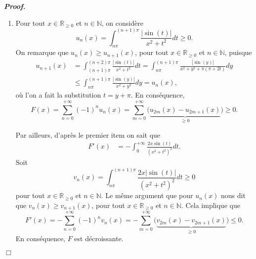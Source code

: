 \documentclass[11pt,a4paper]{article}
\newcommand{\NN}{\mathbb{N}}
\newcommand{\RR}{\mathbb{R}}
\newenvironment{preuve}[1][]
{\vskip 2mm  \noindent\emph{\bf Proof#1. }}{$\Box$ \vskip 2mm}
\let\geq\geqslant
\let\leq\leqslant
\begin{document}
\begin{preuve}
\begin{enumerate}
			\item Pour tout $x \in \RR_{\geq 0}$ et $n \in \NN$, on considère 
			\[     u_n(x) = \int_{n\pi}^{(n+1)\pi} \frac{|\sin (t)|}{ x^2+t^2} dt \geq 0.     \]
			On remarque que $u_{n}(x) \geq u_{n+1}(x)$, pour tout $x \in \RR_{\geq 0}$ et $n \in \NN$, puisque 
			\begin{align*}
			u_{n+1}(x) &= \int_{(n+1)\pi}^{(n+2)\pi} \frac{|\sin (t)|}{ x^2+t^2} dt = \int_{n\pi}^{(n+1)\pi} \frac{|\sin (y)|}{ x^2+y^2 + \pi (\pi + 2t)} dy 
			\\
			&\leq \int_{n\pi}^{(n+1)\pi} \frac{|\sin (y)|}{ x^2+y^2} dy = u_{n}(x),     
			\end{align*} 
			où l'on a fait la substitution $t = y + \pi$. 
			En conséquence, 
			\[     F(x) = \sum_{n=0}^{+\infty} (-1)^{n} u_{n}(x) = \sum_{m=0}^{+\infty} \big(\underset{\geq 0}{\underbrace{u_{2m}(x) - u_{2m+1}(x)}}\big) \geq 0.     \]
			
			Par ailleurs, d'après le premier item on sait que 
			\begin{align*}
			F'(x) &= - \int_{0}^{+\infty} \frac{2 x \sin (t)}{ (x^2+t^2)^{2}} dt.          
			\end{align*} 
			Soit 
			\[     v_n(x) = \int_{n\pi}^{(n+1)\pi} \frac{2 x |\sin (t)|}{(x^2+t^2)^{2}} dt \geq 0     \]
			pour tout $x \in \RR_{\geq 0}$ et $n \in \NN$. 
			Le même argument que pour $u_{n}(x)$ nous dit que $v_{n}(x) \geq v_{n+1}(x)$, pour tout $x \in \RR_{\geq 0}$ et $n \in \NN$. 
			Cela implique que 
			\[     F'(x) = - \sum_{n=0}^{+\infty} (-1)^{n} v_{n}(x) = -\sum_{m=0}^{+\infty} \big(\underset{\geq 0}{\underbrace{v_{2m}(x) - v_{2m+1}(x)}}\big) \leq 0.     \]
			En conséquence, $F$ est décroissante. 
			
		\end{enumerate}
	\end{preuve}
	
\end{document}
